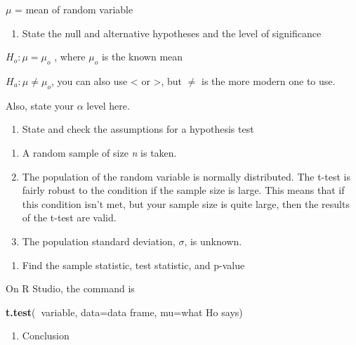 \documentclass[
]{book}
\newenvironment{Shaded}{\begin{snugshade}}{\end{snugshade}}
\newcommand{\DataTypeTok}[1]{\textcolor[rgb]{0.13,0.29,0.53}{#1}}
\newcommand{\KeywordTok}[1]{\textcolor[rgb]{0.13,0.29,0.53}{\textbf{#1}}}
\newcommand{\NormalTok}[1]{#1}
\newcommand{\OperatorTok}[1]{\textcolor[rgb]{0.81,0.36,0.00}{\textbf{#1}}}
\providecommand{\tightlist}{%
  \setlength{\itemsep}{0pt}\setlength{\parskip}{0pt}}
\begin{document}
\(\mu\) = mean of random variable

\begin{enumerate}
\def\labelenumi{\arabic{enumi}.}
\setcounter{enumi}{1}
\tightlist
\item
  State the null and alternative hypotheses and the level of
  significance
\end{enumerate}

\(H_o:\mu=\mu_o\) , where \(\mu_o\) is the known mean

\(H_a:\mu\ne\mu_o\), you can also use \textless{} or \textgreater, but \(\ne\) is the more modern one to use.

Also, state your \(\alpha\) level here.

\begin{enumerate}
\def\labelenumi{\arabic{enumi}.}
\setcounter{enumi}{2}
\tightlist
\item
  State and check the assumptions for a hypothesis test
\end{enumerate}

\begin{enumerate}
\def\labelenumi{\alph{enumi}.}
\item
  A random sample of size \emph{n} is taken.
\item
  The population of the random variable is normally distributed. The t-test is fairly robust to the condition if the sample size is large. This means that if this condition isn't met, but your sample size is quite large, then the results of the t-test are valid.
\item
  The population standard deviation, \(\sigma\), is unknown.
\end{enumerate}

\begin{enumerate}
\def\labelenumi{\arabic{enumi}.}
\setcounter{enumi}{3}
\tightlist
\item
  Find the sample statistic, test statistic, and p-value
\end{enumerate}

On R Studio, the command is

\begin{Shaded}
\begin{Highlighting}[]
\KeywordTok{t.test}\NormalTok{(}\OperatorTok{~}\NormalTok{variable, }\DataTypeTok{data=}\NormalTok{data frame, }\DataTypeTok{mu=}\NormalTok{what Ho says)}
\end{Highlighting}
\end{Shaded}

\begin{enumerate}
\def\labelenumi{\arabic{enumi}.}
\setcounter{enumi}{4}
\tightlist
\item
  Conclusion
\end{enumerate}
\end{document}
